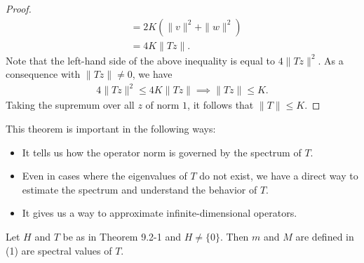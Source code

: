 \begin{proof}
\begin{align*}
                                                                                  &= 2K (\|v\|^{2} + \|w\|^{2}) \\
                                                                                  &= 4K \|Tz\|.
\end{align*}
Note that the left-hand side of the above inequality is equal to \( 4 \|Tz\|^{2} \). As a consequence with \( \|Tz \| \neq 0  \), we have 
\begin{align*}  4 \|Tz\|^{2} \leq 4K \|Tz\| \implies \|Tz\| \leq K.
\end{align*}
Taking the supremum over all \( z  \) of norm \( 1  \), it follows that \( \|T\| \leq K   \).
\end{proof}

This theorem is important in the following ways: 
\begin{itemize}
    \item It tells us how the operator norm is governed by the spectrum of \( T  \).
    \item Even in cases where the eigenvalues of \( T  \) do not exist, we have a direct way to estimate the spectrum and understand the behavior of \( T  \).
    \item It gives us a way to approximate infinite-dimensional operators.
\end{itemize}

\begin{theorem}
    Let \( H  \) and \( T  \) be as in Theorem 9.2-1 and \( H \neq \{ 0  \}  \). Then \( m  \) and \( M  \) are defined in (1) are spectral values of \( T  \).
\end{theorem}

